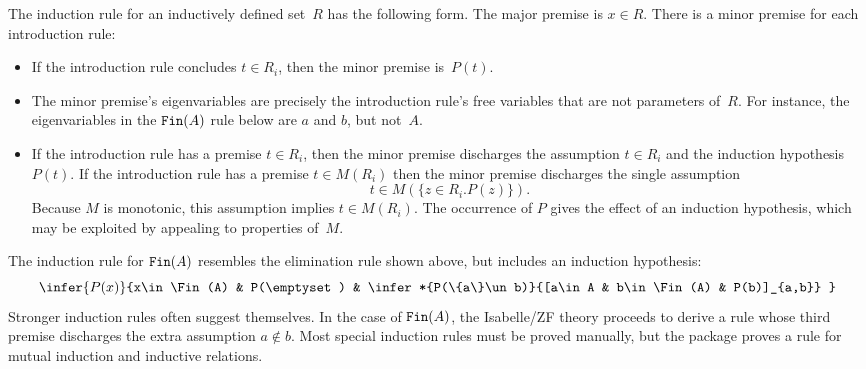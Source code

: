 The induction rule for an inductively defined set~$R$ has the following form.
The major premise is $x\in R$.  There is a minor premise for each
introduction rule:
\begin{itemize}
\item If the introduction rule concludes $t\in R_i$, then the minor premise
is~$P(t)$.

\item The minor premise's eigenvariables are precisely the introduction
rule's free variables that are not parameters of~$R$.  For instance, the
eigenvariables in the ${\tt Fin}(A)$ rule below are $a$ and $b$, but not~$A$.

\item If the introduction rule has a premise $t\in R_i$, then the minor
premise discharges the assumption $t\in R_i$ and the induction
hypothesis~$P(t)$.  If the introduction rule has a premise $t\in M(R_i)$
then the minor premise discharges the single assumption
\[ t\in M(\{z\in R_i. P(z)\}). \] 
Because $M$ is monotonic, this assumption implies $t\in M(R_i)$.  The
occurrence of $P$ gives the effect of an induction hypothesis, which may be
exploited by appealing to properties of~$M$.
\end{itemize}
The induction rule for ${\tt Fin}(A)$ resembles the elimination rule shown above,
but includes an induction hypothesis:
\[ \infer{P(x)}{x\in\Fin(A) & P(\emptyset)
        & \infer*{P(\{a\}\un b)}{[a\in A & b\in\Fin(A) & P(b)]_{a,b}} }
\] 
Stronger induction rules often suggest themselves.  In the case of
${\tt Fin}(A)$, the Isabelle/ZF theory proceeds to derive a rule whose third
premise discharges the extra assumption $a\not\in b$.  Most special induction
rules must be proved manually, but the package proves a rule for mutual
induction and inductive relations.

